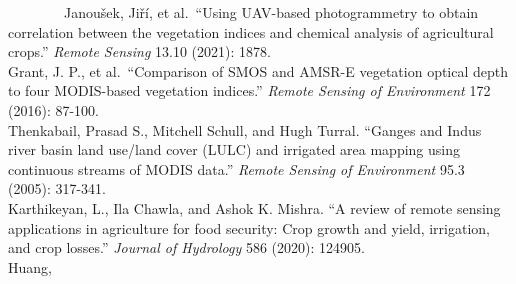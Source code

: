 \documentclass[
  letterpaper,
  DIV=11,
  numbers=noendperiod]{scrreprt}
\begin{document}
~~~~~~~~Janoušek, Jiří, et al.~``Using UAV-based photogrammetry to
obtain correlation between the vegetation indices and chemical analysis
of agricultural crops.'' \emph{Remote Sensing} 13.10 (2021): 1878.\\
\hspace*{0.333em}\hspace*{0.333em}\hspace*{0.333em}\hspace*{0.333em}\hspace*{0.333em}\hspace*{0.333em}\hspace*{0.333em}\hspace*{0.333em}Grant,
J. P., et al.~``Comparison of SMOS and AMSR-E vegetation optical depth
to four MODIS-based vegetation indices.'' \emph{Remote Sensing of
Environment} 172 (2016): 87-100.\\
\hspace*{0.333em}\hspace*{0.333em}\hspace*{0.333em}\hspace*{0.333em}\hspace*{0.333em}\hspace*{0.333em}\hspace*{0.333em}\hspace*{0.333em}Thenkabail,
Prasad S., Mitchell Schull, and Hugh Turral. ``Ganges and Indus river
basin land use/land cover (LULC) and irrigated area mapping using
continuous streams of MODIS data.'' \emph{Remote Sensing of Environment}
95.3 (2005): 317-341.\\
\hspace*{0.333em}\hspace*{0.333em}\hspace*{0.333em}\hspace*{0.333em}\hspace*{0.333em}\hspace*{0.333em}\hspace*{0.333em}\hspace*{0.333em}Karthikeyan,
L., Ila Chawla, and Ashok K. Mishra. ``A review of remote sensing
applications in agriculture for food security: Crop growth and yield,
irrigation, and crop losses.'' \emph{Journal of Hydrology} 586 (2020):
124905.\\
\hspace*{0.333em}\hspace*{0.333em}\hspace*{0.333em}\hspace*{0.333em}\hspace*{0.333em}\hspace*{0.333em}\hspace*{0.333em}\hspace*{0.333em}Huang,
\end{document}
